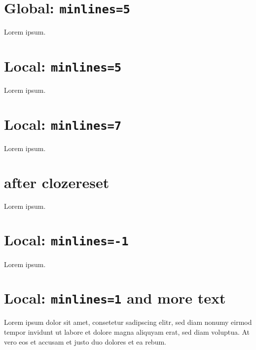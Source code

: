 \documentclass{article}
\begin{document}
{}

\section{Global: \texttt{minlines=5}}

\begin{clozepar}
Lorem ipsum.
\end{clozepar}

\section{Local: \texttt{minlines=5}}

\begin{clozepar}[minlines=5]
Lorem ipsum.
\end{clozepar}

\section{Local: \texttt{minlines=7}}

\begin{clozepar}[minlines=7]
Lorem ipsum.
\end{clozepar}

\section{after clozereset}

\clozereset

\begin{clozepar}
Lorem ipsum.
\end{clozepar}

\section{Local: \texttt{minlines=-1}}

\begin{clozepar}[minlines=-1]
Lorem ipsum.
\end{clozepar}

\section{Local: \texttt{minlines=1} and more text }

\begin{clozepar}[minlines=-1]
Lorem ipsum dolor sit amet, consetetur sadipscing elitr, sed diam nonumy eirmod tempor invidunt ut labore et dolore magna aliquyam erat, sed diam voluptua. At vero eos et accusam et justo duo dolores et ea rebum.\end{clozepar}
\end{document}
